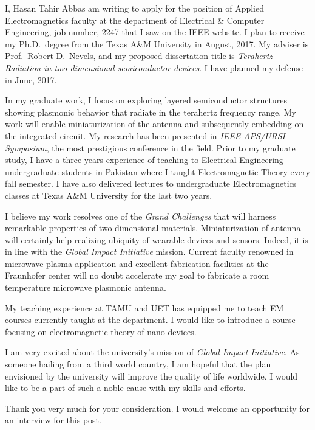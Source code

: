 \documentclass[10pt,stdletter,dateno]{newlfm}
\begin{document}
\begin{newlfm}

I, Hasan Tahir Abbas am writing to apply for the position of Applied Electromagnetics faculty at the department of Electrical \& Computer Engineering, job number, 2247 that I saw on the IEEE website.  I plan to receive my
Ph.D.\ degree from the Texas A\&M University in August, 2017.  My adviser is
Prof.\ Robert D.\ Nevels, and my proposed dissertation title is \emph{Terahertz Radiation in two-dimensional semiconductor devices}. I have planned my defense in June, 2017.


In my graduate work, I focus on exploring layered semiconductor structures showing plasmonic behavior that radiate in the terahertz frequency range. My work will enable miniaturization of the antenna and subsequently embedding on the integrated circuit. My research has been presented in \emph{IEEE APS/URSI Symposium}, the most prestigious conference in the field. Prior to my graduate study, I have a three years experience of teaching to Electrical Engineering undergraduate students in Pakistan where I taught Electromagnetic Theory every fall semester. I have also delivered lectures to undergraduate Electromagnetics classes at Texas A\&M University for the last two years.

I believe my work resolves one of the \emph{Grand Challenges} that will harness remarkable properties of two-dimensional materials. Miniaturization of antenna will certainly help realizing ubiquity of wearable devices and sensors. Indeed, it is in line with the \emph{Global Impact Initiative} mission. Current faculty renowned in microwave plasma application and excellent fabrication facilities at the Fraunhofer center will no doubt accelerate my goal to fabricate a room temperature microwave plasmonic antenna.

My teaching experience at TAMU and UET has equipped me to teach EM courses currently taught at the department. I would like to introduce a course focusing on electromagnetic theory of nano-devices.

I am very excited about the university's mission of \emph{Global Impact Initiative}. As someone hailing from a third world country, I am hopeful that the plan envisioned by the university will improve the quality of life worldwide. I would like to be a part of such a noble cause with my skills and efforts.

Thank you very much for your consideration. I would welcome an opportunity for an interview for this post. 


\end{newlfm}
\end{document}
